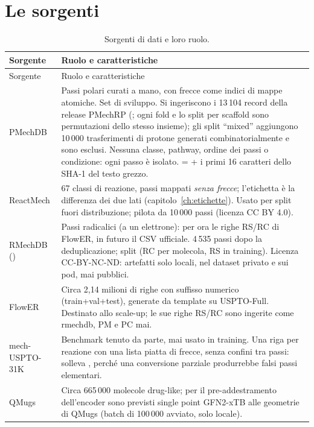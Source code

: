 \documentclass[11pt,a4paper]{report}
\newcommand{\code}[1]{\texttt{\detokenize{#1}}}
\begin{document}
\section{Le sorgenti}
\begin{longtable}{@{}p{2.6cm}p{12.6cm}@{}}
\caption{Sorgenti di dati e loro ruolo.}\label{tab:sorgenti}\\
\toprule
Sorgente & Ruolo e caratteristiche\\
\midrule
\endfirsthead
\toprule Sorgente & Ruolo e caratteristiche\\ \midrule
\endhead
PMechDB & Passi polari curati a mano, con frecce come indici di mappe atomiche. Set di sviluppo.
  Si ingeriscono i 13\,104 record \code{mc_only} della release PMechRP (\code{fold0/raw/*.txt}; ogni
  fold e lo split per scaffold sono permutazioni dello stesso insieme); gli split \enquote{mixed}
  aggiungono 10\,000 trasferimenti di protone generati combinatorialmente e sono esclusi. Nessuna
  classe, pathway, ordine dei passi o condizione: ogni passo è isolato. \code{step_id} =
  \code{"pmechdb-"} + i primi 16 caratteri dello SHA-1 del testo grezzo.\\
ReactMech & 67 classi di reazione, passi mappati \emph{senza frecce}; l'etichetta è la differenza
  dei due lati (capitolo~\ref{ch:etichette}). Usato per split fuori distribuzione; pilota da 10\,000
  passi (licenza CC BY 4.0).\\
RMechDB (\code{rmechdb}) & Passi radicalici (a un elettrone): per ora le righe RS/RC di FlowER,
  in futuro il CSV ufficiale. 4\,535 passi dopo la deduplicazione; split \code{rc_molecule} (RC per
  molecola, RS in training). Licenza CC-BY-NC-ND: artefatti solo locali, nel dataset privato e sui pod,
  mai pubblici.\\
FlowER & Circa 2{,}14 milioni di righe con suffisso numerico (train+val+test), generate da template
  su USPTO-Full. Destinato allo scale-up; le sue righe RS/RC sono ingerite come rmechdb, PM e PC mai.\\
mech-USPTO-31K & Benchmark tenuto da parte, mai usato in training. Una riga per reazione con una
  lista piatta di frecce, senza confini tra passi: \code{load} solleva \code{NotImplementedError},
  perché una conversione parziale produrrebbe falsi passi elementari.\\
QMugs & Circa 665\,000 molecole drug-like; per il pre-addestramento dell'encoder sono previsti
  single point GFN2-xTB alle geometrie di QMugs (batch di 100\,000 avviato, solo locale).\\
\bottomrule
\end{longtable}
\end{document}
